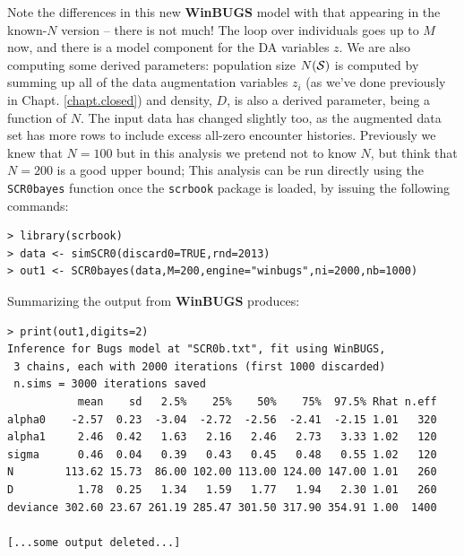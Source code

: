 Note the differences in this new {\bf WinBUGS} model with that
appearing in the known-$N$ version -- there is not much!  The loop
over individuals goes up to $M$ now, and there is a model component
for the DA variables $z$. We are also computing some derived
parameters: population size $N({\cal S})$ is computed by summing up
all of the data augmentation variables $z_{i}$ (as we've done
previously in Chapt. \ref{chapt.closed}) and density, $D$, is also a
derived parameter, being a function of $N$.  The input data has
changed slightly too, as the augmented data set has more rows to
include excess all-zero encounter histories. Previously we knew that
$N=100$ but in this analysis we pretend not to know $N$, but think
that $N=200$ is a good upper bound;
This analysis can be run directly using the \mbox{\tt SCR0bayes}
function  once the \mbox{\tt scrbook} package is loaded,
by issuing the following commands:
\begin{verbatim}
> library(scrbook)
> data <- simSCR0(discard0=TRUE,rnd=2013)
> out1 <- SCR0bayes(data,M=200,engine="winbugs",ni=2000,nb=1000)
\end{verbatim}
Summarizing the output from {\bf WinBUGS} produces:
{\small
\begin{verbatim}
> print(out1,digits=2)
Inference for Bugs model at "SCR0b.txt", fit using WinBUGS,
 3 chains, each with 2000 iterations (first 1000 discarded)
 n.sims = 3000 iterations saved
           mean    sd   2.5%    25%    50%    75%  97.5% Rhat n.eff
alpha0    -2.57  0.23  -3.04  -2.72  -2.56  -2.41  -2.15 1.01   320
alpha1     2.46  0.42   1.63   2.16   2.46   2.73   3.33 1.02   120
sigma      0.46  0.04   0.39   0.43   0.45   0.48   0.55 1.02   120
N        113.62 15.73  86.00 102.00 113.00 124.00 147.00 1.01   260
D          1.78  0.25   1.34   1.59   1.77   1.94   2.30 1.01   260
deviance 302.60 23.67 261.19 285.47 301.50 317.90 354.91 1.00  1400

[...some output deleted...]

\end{verbatim}
}

